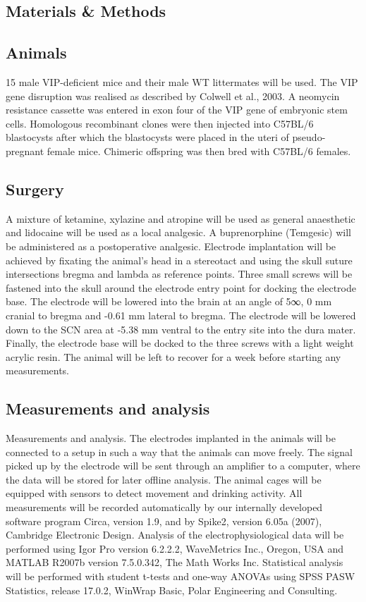 \begin{multicols}{2}


\section{Materials \& Methods}

\subsection{Animals}
15 male VIP-deficient mice and their male WT littermates will be used. The VIP gene disruption was realised as described by Colwell et al., 2003. A neomycin resistance cassette was entered in exon four of the VIP gene of embryonic stem cells. Homologous recombinant clones were then injected into C57BL/6 blastocysts after which the blastocysts were placed in the uteri of pseudo-pregnant female mice. Chimeric offspring was then bred with C57BL/6 females.

\subsection{Surgery}
A mixture of ketamine, xylazine and atropine will be used as general anaesthetic and lidocaine will be used as a local analgesic. A buprenorphine (Temgesic) will be administered as a postoperative analgesic. Electrode implantation will be achieved by fixating the animal's head in a stereotact and using the skull suture intersections bregma and lambda as reference points. Three small screws will be fastened into the skull around the electrode entry point for docking the electrode base. The electrode will be lowered into the brain at an angle of 5∞, 0 mm cranial to bregma and -0.61 mm lateral to bregma. The electrode will be lowered down to the SCN area at -5.38 mm ventral to the entry site into the dura mater. Finally, the electrode base will be docked to the three screws with a light weight acrylic resin. The animal will be left to recover for a week  before starting any measurements.

\subsection{Measurements and analysis}
Measurements and analysis. The electrodes implanted in the animals will be connected to a setup in such a way that the animals can move freely. The signal picked up by the electrode will be sent through an amplifier to a computer, where the data will be stored for later offline analysis. The animal cages will be equipped with sensors to detect movement and drinking activity. All measurements will be recorded automatically by our internally developed software program Circa, version 1.9, and by Spike2, version 6.05a (2007), Cambridge Electronic Design. Analysis of the electrophysiological data will be performed using Igor Pro version 6.2.2.2, WaveMetrics Inc., Oregon, USA and MATLAB R2007b version 7.5.0.342, The Math Works Inc. Statistical analysis will be performed with student t-tests and one-way ANOVAs using SPSS PASW Statistics, release 17.0.2, WinWrap Basic, Polar Engineering and Consulting. 


\end{multicols}
